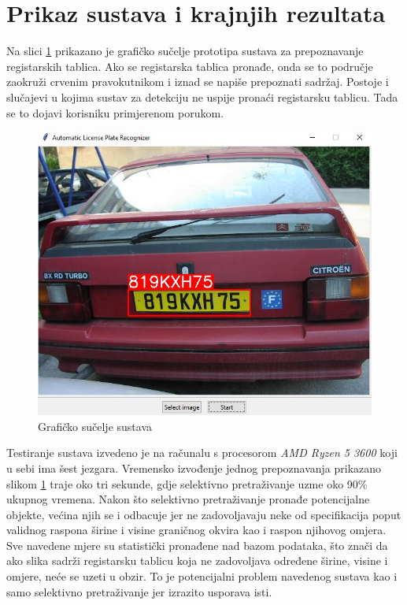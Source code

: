 \documentclass[times, utf8, diplomski]{fer}
\begin{document}
\section{Prikaz sustava i krajnjih rezultata}
Na slici \ref{fig:program} prikazano je grafičko sučelje prototipa sustava za prepoznavanje registarskih tablica. Ako se registarska tablica pronađe, onda se to područje zaokruži crvenim pravokutnikom i iznad se napiše prepoznati sadržaj. Postoje i slučajevi u kojima sustav za detekciju ne uspije pronaći registarsku tablicu. Tada se to dojavi korisniku primjerenom porukom.
\begin{figure}[H]
    \centering
    \includegraphics[scale=0.6]{figures/results/gui.jpg}
    \caption{Grafičko sučelje sustava}
    \label{fig:program}
\end{figure}
Testiranje sustava izvedeno je na računalu s procesorom \textit{AMD Ryzen 5 3600} koji u sebi ima šest jezgara. Vremensko izvođenje jednog prepoznavanja prikazano slikom \ref{fig:program} traje oko tri sekunde, gdje selektivno pretraživanje uzme oko 90\% ukupnog vremena. Nakon što selektivno pretraživanje pronađe potencijalne objekte, većina njih se i odbacuje jer ne zadovoljavaju neke od specifikacija poput validnog raspona širine i visine graničnog okvira kao i raspon njihovog omjera. Sve navedene mjere su statistički pronađene nad bazom podataka, što znači da ako slika sadrži registarsku tablicu koja ne zadovoljava određene širine, visine i omjere, neće se uzeti u obzir. To je potencijalni problem navedenog sustava kao i samo selektivno pretraživanje jer izrazito usporava isti.
\end{document}
